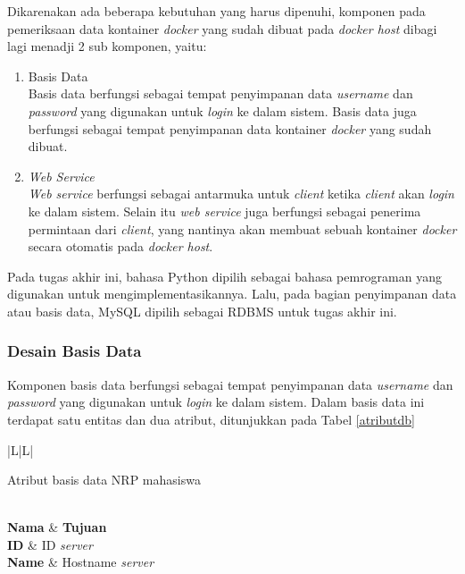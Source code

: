     Dikarenakan ada beberapa kebutuhan yang harus dipenuhi, komponen pada pemeriksaan data kontainer \textit{docker} yang sudah dibuat pada \textit{docker host} dibagi lagi menadji 2 sub komponen, yaitu:
   	\begin{enumerate}
   		\item Basis Data \\
   		Basis data berfungsi sebagai tempat penyimpanan data \textit{username} dan \textit{password} yang digunakan untuk \textit{login} ke dalam sistem. Basis data juga berfungsi sebagai tempat penyimpanan data kontainer \textit{docker} yang sudah dibuat.
   		\item \textit{Web Service} \\
   		\textit{Web service} berfungsi sebagai antarmuka untuk \textit{client} ketika \textit{client} akan \textit{login} ke dalam sistem. Selain itu \textit{web service} juga berfungsi sebagai penerima permintaan dari \textit{client}, yang nantinya akan membuat sebuah kontainer \textit{docker} secara otomatis pada \textit{docker host}.
   	\end{enumerate}
   	
   	Pada tugas akhir ini, bahasa Python dipilih sebagai bahasa pemrograman yang digunakan untuk mengimplementasikannya. Lalu, pada bagian penyimpanan data atau basis data, MySQL dipilih sebagai RDBMS untuk tugas akhir ini.
   	\subsubsection{Desain Basis Data}
   	Komponen basis data berfungsi sebagai tempat penyimpanan data \textit{username} dan \textit{password} yang digunakan untuk \textit{login} ke dalam sistem. Dalam basis data ini terdapat satu entitas dan dua atribut, ditunjukkan pada Tabel \ref{atributdb}
   	\begin{ltabulary}{|L|L|} 
   		\caption{Atribut basis data NRP mahasiswa} \label{atributdb} \\
   		\hline
   		\textbf{Nama} & \textbf{Tujuan} \\ \hline
   		\endhead
   		\endfoot
   		\endlastfoot
   		\textbf{ID} & ID \textit{server}\\ \hline
   		\textbf{Name} & Hostname \textit{server} \\ \hline
   	\end{ltabulary}
   	
